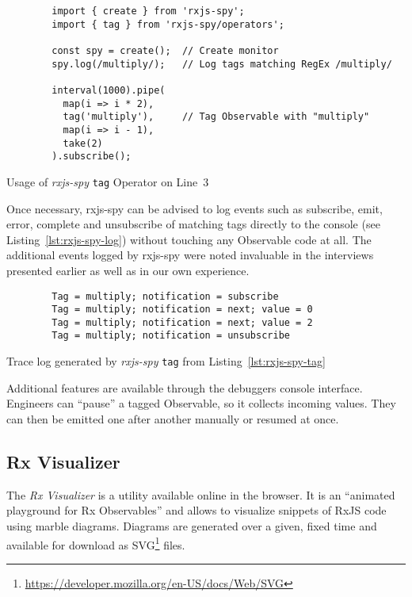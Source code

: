 \documentclass[12pt,a4paper]{article}
\begin{document}
\begin{listing}[H]
	\begin{verbatim}
		import { create } from 'rxjs-spy';
		import { tag } from 'rxjs-spy/operators';

		const spy = create();  // Create monitor
		spy.log(/multiply/);   // Log tags matching RegEx /multiply/

		interval(1000).pipe(
		  map(i => i * 2),
		  tag('multiply'),     // Tag Observable with "multiply"
		  map(i => i - 1),
		  take(2)
		).subscribe();
	\end{verbatim}
	\caption{Usage of \emph{rxjs-spy} \texttt{tag} Operator on Line~3}
	\label{lst:rxjs-spy-tag}
\end{listing}

Once necessary, rxjs-spy can be advised to log events such as subscribe, emit, error, complete and unsubscribe of matching tags directly to the console (see Listing~\ref{lst:rxjs-spy-log}) without touching any Observable code at all. The additional events logged by rxjs-spy were noted invaluable in the interviews presented earlier as well as in our own experience.

\begin{listing}[H]
	\begin{verbatim}
		Tag = multiply; notification = subscribe
		Tag = multiply; notification = next; value = 0
		Tag = multiply; notification = next; value = 2
		Tag = multiply; notification = unsubscribe
	\end{verbatim}
	\caption{Trace log generated by \emph{rxjs-spy} \texttt{tag} from Listing~\ref{lst:rxjs-spy-tag}}
	\label{lst:rxjs-spy-log}
\end{listing}

Additional features are available through the debuggers console interface. Engineers can ``pause'' a tagged Observable, so it collects incoming values. They can then be emitted one after another manually or resumed at once.

\subsection{Rx Visualizer}

The \emph{Rx Visualizer}\cite{rxviz} is a utility available online in the browser. It is an ``animated playground for Rx Observables''\cite{rxviz} and allows to visualize snippets of RxJS code using marble diagrams. Diagrams are generated over a given, fixed time and available for download as SVG\footnote{\url{https://developer.mozilla.org/en-US/docs/Web/SVG}} files.
\end{document}
